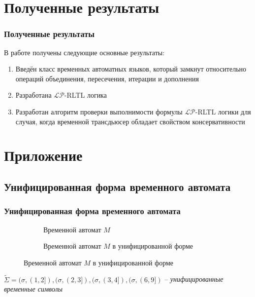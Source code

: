\documentclass{beamer}
\begin{document}


\section{Полученные результаты}

\begin{frame}
\frametitle{Полученные результаты}


В работе получены следующие основные результаты:
\begin{enumerate}
	\item Введён класс временных автоматных языков, который замкнут относительно операций объединения, пересечения, итерации и дополнения
  	\item Разработана $\mathcal{LP}$-RLTL логика
  	\item Разработан алгоритм проверки выполнимости формулы $\mathcal{LP}$-RLTL логики для случая, когда временной трансдьюсер обладает свойством консервативности
\end{enumerate}

\end{frame}

\section{Приложение}

\subsection{Унифицированная форма временного автомата}

\begin{frame}
\frametitle{Унифицированная форма временного автомата}

\begin{figure}
\centering
\begin{subfigure}{.5\textwidth}
  \centering
  \caption{Временной автомат $M$}
\end{subfigure}%
\begin{subfigure}{.5\textwidth}
  \centering
  \caption{Временной автомат $M$ в унифицированной форме}
\end{subfigure}
\end{figure}

$\widetilde{\Sigma} = (\sigma, (1, 2]), (\sigma, (2, 3]), (\sigma, (3, 4]), (\sigma, (6, 9])$ -- \textit{унифицированные временные символы}

\end{frame}
 
\end{document}
